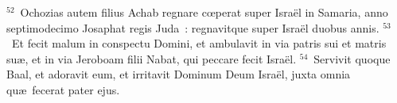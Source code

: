 ${}^{52}$~Ochozias autem filius Achab regnare cœperat super Isra\"el in Samaria, anno septimodecimo Josaphat regis Juda~: regnavitque super Isra\"el duobus annis.
${}^{53}$~Et fecit malum in conspectu Domini, et ambulavit in via patris sui et matris su\ae , et in via Jeroboam filii Nabat, qui peccare fecit Isra\"el.
${}^{54}$~Servivit quoque Baal, et adoravit eum, et irritavit Dominum Deum Isra\"el, juxta omnia qu\ae\ fecerat pater ejus.
